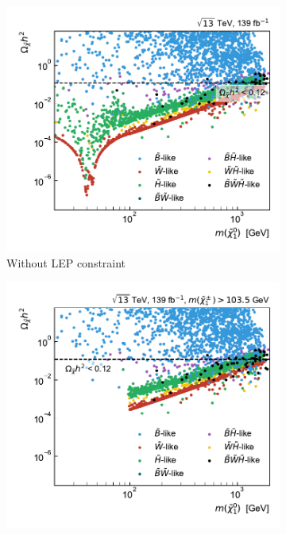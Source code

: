 \begin{figure}[h]
	\centering
	\begin{subfigure}[b]{0.49\linewidth}
		\centering\includegraphics[width=\textwidth]{scatter/relic_density_lsp}
		\caption{Without LEP constraint\label{fig:relic_density_lsp_no_constraint}}
	\end{subfigure}\hfill
	\begin{subfigure}[b]{0.49\linewidth}
		\centering\includegraphics[width=\textwidth]{scatter/relic_density_lsp_limits}

\end{subfigure}
\end{figure}
